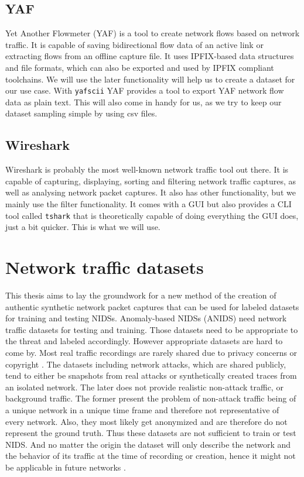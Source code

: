 \documentclass[
	ngerman,
	ruledheaders=section,%
	class=report,%
	thesis={type=bachelor},%
	accentcolor=9c,%
	custommargins=true,%
	marginpar=false,%
	parskip=half-,%
	fontsize=11pt,%
]{tudapub}
\let\code\texttt
\begin{document}
\subsection{YAF}
\label{sec:yaf}

Yet Another Flowmeter (YAF) is a tool to create network flows based on network traffic.
It is capable of saving bidirectional flow data of an active link or extracting flows from an offline capture file.
It uses IPFIX-based data structures and file formats, which can also be exported and used by IPFIX compliant toolchains.
We will use the later functionality will help us to create a dataset for our use case.
With \code{yafscii} YAF provides a tool to export YAF network flow data as plain text.
This will also come in handy for us, as we try to keep our dataset sampling simple by using csv files.

\subsection{Wireshark}
\label{sec:wireshark}

Wireshark is probably the most well-known network traffic tool out there.
It is capable of capturing, displaying, sorting and filtering network traffic captures, as well as analysing network packet captures.
It also has other functionality, but we mainly use the filter functionality.
It comes with a GUI but also provides a CLI tool called \code{tshark} that is theoretically capable of doing everything the GUI does, just a bit quicker.
This is what we will use.

\section{Network traffic datasets}
\label{sec:networkTrafficDatasets}

This thesis aims to lay the groundwork for a new method of the creation of authentic synthetic network packet captures
that can be used for labeled datasets for training and testing NIDSs.
Anomaly-based NIDSs (ANIDS) need network traffic datasets for testing and training.
Those datasets need to be appropriate to the threat and labeled accordingly.
However appropriate datasets are hard to come by.
Most real traffic recordings are rarely shared due to privacy concerns \cite{ringFlowbasedNetworkTraffic2019a} or copyright \cite{corderoID2TDIYDataset2015}.
The datasets including network attacks,
which are shared publicly,
tend to either be snapshots from real attacks or synthetically created traces from an isolated network.
The later does not provide realistic non-attack traffic, or background traffic.
The former present the problem of non-attack traffic being of a unique network in a unique time frame and therefore not representative of every network.
Also, they most likely get anonymized and are therefore do not represent the ground truth.
Thus these datasets are not sufficient to train or test NIDS.
And no matter the origin the dataset will only describe the network and the behavior of its traffic at the time of recording or creation, hence it might not be applicable in future networks \cite{ringFlowbasedNetworkTraffic2019a}.
\end{document}
